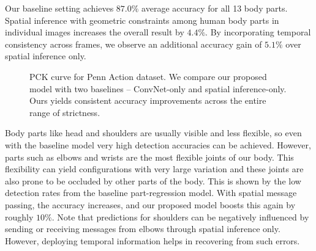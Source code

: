 \documentclass[10pt,twocolumn,letterpaper]{article}
\begin{document}
Our baseline setting achieves $87.0\%$ average accuracy for all 13 body parts. Spatial inference with geometric constraints among human body parts in individual images increases the overall result by $4.4\%$. By incorporating temporal consistency across frames, we observe an additional accuracy gain of $5.1\%$ over spatial inference only.\\
\begin{figure*}[h]
\begin{center}
\hspace*{-1.5em}
\hspace*{-1.5em}
\vspace{-3.5mm}
\hspace*{-1.5em}
%
\hspace*{-1.5em}
%
\end{center}
   \caption{PCK curve for Penn Action dataset. We compare our proposed model with two baselines -- ConvNet-only and spatial inference-only. Ours yields consistent accuracy improvements across the entire range of strictness.}
\label{fig:PCK curve Penn}
\end{figure*}
Body parts like head and shoulders are usually visible and less flexible, so even with the baseline model very high detection accuracies can be achieved. However, parts such as elbows and wrists are the most flexible joints of our body. This flexibility can yield configurations with very large variation and these joints are also prone to be occluded by other parts of the body. This is shown by the low detection rates from the baseline part-regression model. With spatial message passing, the accuracy increases, and our proposed model boosts this again by roughly $10\%$. Note that predictions for shoulders can be negatively influenced by sending or receiving messages from elbows through spatial inference only. However, deploying temporal information helps in recovering from such errors.
\end{document}
